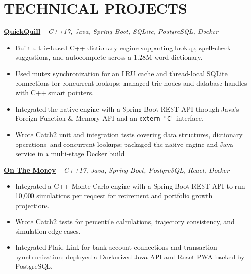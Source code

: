 \documentclass[10pt,letterpaper]{article}
\begin{document}
\section*{TECHNICAL PROJECTS}
\textbf{\href{https://github.com/nickczak/QuickQuill-Dictionary-SpellChecker}{QuickQuill}} -- \textit{C++17, Java, Spring Boot, SQLite, PostgreSQL, Docker}
\begin{itemize}
  \item Built a trie-based C++ dictionary engine supporting lookup, spell-check suggestions, and autocomplete across a 1.28M-word dictionary.
  \item Used mutex synchronization for an LRU cache and thread-local SQLite connections for concurrent lookups; managed trie nodes and database handles with C++ smart pointers.
  \item Integrated the native engine with a Spring Boot REST API through Java's Foreign Function \& Memory API and an \texttt{extern "C"} interface.
  \item Wrote Catch2 unit and integration tests covering data structures, dictionary operations, and concurrent lookups; packaged the native engine and Java service in a multi-stage Docker build.
\end{itemize}

\textbf{\href{https://github.com/nickczak/OnTheMoney-Finance-Tracker}{On The Money}} -- \textit{C++17, Java, Spring Boot, PostgreSQL, React, Docker}
\begin{itemize}
  \item Integrated a C++ Monte Carlo engine with a Spring Boot REST API to run 10,000 simulations per request for retirement and portfolio growth projections.
  \item Wrote Catch2 tests for percentile calculations, trajectory consistency, and simulation edge cases.
  \item Integrated Plaid Link for bank-account connections and transaction synchronization; deployed a Dockerized Java API and React PWA backed by PostgreSQL.
\end{itemize}
\end{document}
